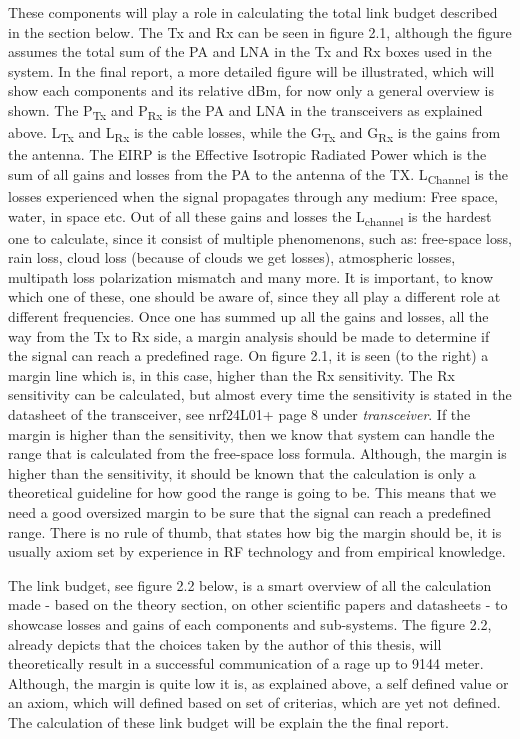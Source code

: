 These components will play a role in calculating the total link budget described in the section below. The Tx and Rx can be seen in figure 2.1, although the figure assumes the total sum of the PA and LNA in the Tx and Rx boxes used in the system. In the final report, a more detailed figure will be illustrated, which will show each components and its relative dBm, for now only a general overview is shown. The P\textsubscript{Tx} and P\textsubscript{Rx} is the PA and LNA in the transceivers as explained above. L\textsubscript{Tx} and L\textsubscript{Rx} is the cable losses, while the G\textsubscript{Tx} and G\textsubscript{Rx} is the gains from the antenna. The EIRP is the Effective Isotropic Radiated Power which is the sum of all gains and losses from the PA to the antenna of the TX. 
L\textsubscript{Channel} is the losses experienced when the signal propagates through any medium: Free space, water, in space etc. Out of all these gains and losses the L\textsubscript{channel} is the hardest one to calculate, since it consist of multiple phenomenons, such as: free-space loss, rain loss, cloud loss (because of clouds we get losses), atmospheric losses, multipath loss polarization mismatch and many more. It is important, to know which one of these, one should be aware of, since they all play a different role at different frequencies. Once one has summed up all the gains and losses, all the way from the Tx to Rx side, a margin analysis should be made to determine if the signal can reach a predefined rage. On figure 2.1, it is seen (to the right) a margin line which is, in this case, higher than the Rx sensitivity. The Rx sensitivity can be calculated, but almost every time the sensitivity is stated in the datasheet of the transceiver, see nrf24L01+\cite{nrf24l01+} page 8 under \textit{transceiver}. If the margin is higher than the sensitivity, then we know that system can handle the range that is calculated from the free-space loss formula. Although, the margin is higher than the sensitivity, it should be known that the calculation is only a theoretical guideline for how good the range is going to be. This means that we need a good oversized margin to be sure that the signal can reach a predefined range. There is no rule of thumb, that states how big the margin should be, it is usually axiom set by experience in RF technology and from empirical knowledge.

The link budget, see figure 2.2 below, is a smart overview of all the calculation made - based on the theory section, on other scientific papers and datasheets - to showcase losses and gains of each components and sub-systems. The figure 2.2, already depicts that the choices taken by the author of this thesis, will theoretically result in a successful communication of a rage up to 9144 meter. Although, the margin is quite low it is, as explained above, a self defined value or an axiom, which will defined based on set of criterias, which are yet not defined. The calculation of these link budget will be explain the the final report. 



